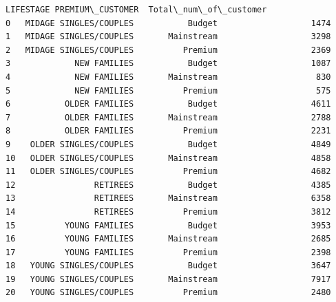 \documentclass[11pt]{article}
\makeatletter
\newcommand{\boxspacing}{\kern\kvtcb@left@rule\kern\kvtcb@boxsep}
\newcommand{\prompt}[4]{
        {\ttfamily\llap{{\color{#2}[#3]:\hspace{3pt}#4}}\vspace{-\baselineskip}}
    }
\makeatother
\begin{document}
            \begin{tcolorbox}[breakable, size=fbox, boxrule=.5pt, pad at break*=1mm, opacityfill=0]
\prompt{Out}{outcolor}{264}{\boxspacing}
\begin{Verbatim}[commandchars=\\\{\}]
                 LIFESTAGE PREMIUM\_CUSTOMER  Total\_num\_of\_customer
0   MIDAGE SINGLES/COUPLES           Budget                   1474
1   MIDAGE SINGLES/COUPLES       Mainstream                   3298
2   MIDAGE SINGLES/COUPLES          Premium                   2369
3             NEW FAMILIES           Budget                   1087
4             NEW FAMILIES       Mainstream                    830
5             NEW FAMILIES          Premium                    575
6           OLDER FAMILIES           Budget                   4611
7           OLDER FAMILIES       Mainstream                   2788
8           OLDER FAMILIES          Premium                   2231
9    OLDER SINGLES/COUPLES           Budget                   4849
10   OLDER SINGLES/COUPLES       Mainstream                   4858
11   OLDER SINGLES/COUPLES          Premium                   4682
12                RETIREES           Budget                   4385
13                RETIREES       Mainstream                   6358
14                RETIREES          Premium                   3812
15          YOUNG FAMILIES           Budget                   3953
16          YOUNG FAMILIES       Mainstream                   2685
17          YOUNG FAMILIES          Premium                   2398
18   YOUNG SINGLES/COUPLES           Budget                   3647
19   YOUNG SINGLES/COUPLES       Mainstream                   7917
20   YOUNG SINGLES/COUPLES          Premium                   2480
\end{Verbatim}
\end{tcolorbox}
        
\end{document}
